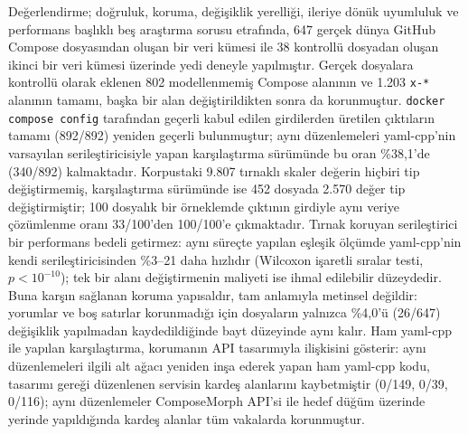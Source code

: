 \documentclass[conference]{IEEEtran}
\begin{document}
Değerlendirme; doğruluk, koruma, değişiklik yerelliği, ileriye dönük
uyumluluk ve performans başlıklı beş araştırma sorusu etrafında, 647 gerçek
dünya GitHub Compose dosyasından oluşan bir veri kümesi ile 38 kontrollü
dosyadan oluşan ikinci bir veri kümesi üzerinde yedi deneyle yapılmıştır.
Gerçek dosyalara kontrollü olarak eklenen 802 modellenmemiş Compose alanının
ve 1.203 \texttt{x-*} alanının tamamı, başka bir alan değiştirildikten sonra
da korunmuştur. \texttt{docker compose config} tarafından geçerli kabul
edilen girdilerden üretilen çıktıların tamamı (892/892) yeniden geçerli
bulunmuştur; aynı düzenlemeleri yaml-cpp'nin varsayılan serileştiricisiyle
yapan karşılaştırma sürümünde bu oran \%38,1'de (340/892) kalmaktadır. Korpustaki
9.807 tırnaklı skaler değerin hiçbiri tip değiştirmemiş, karşılaştırma sürümünde ise
452 dosyada 2.570 değer tip değiştirmiştir; 100 dosyalık bir örneklemde
çıktının girdiyle aynı veriye çözümlenme oranı 33/100'den 100/100'e
çıkmaktadır. Tırnak koruyan serileştirici
bir performans bedeli getirmez: aynı süreçte yapılan eşleşik ölçümde
yaml-cpp'nin kendi serileştiricisinden \%3--21 daha hızlıdır (Wilcoxon
işaretli sıralar testi, $p < 10^{-10}$); tek bir alanı değiştirmenin
maliyeti ise ihmal edilebilir düzeydedir. Buna karşın sağlanan koruma
yapısaldır, tam anlamıyla metinsel değildir: yorumlar ve boş satırlar
korunmadığı için dosyaların yalnızca \%4,0'ü (26/647) değişiklik yapılmadan
kaydedildiğinde bayt düzeyinde aynı kalır. Ham yaml-cpp ile yapılan
karşılaştırma, korumanın API tasarımıyla ilişkisini gösterir: aynı
düzenlemeleri ilgili alt ağacı yeniden inşa ederek yapan ham yaml-cpp kodu,
tasarımı gereği düzenlenen servisin kardeş alanlarını kaybetmiştir (0/149,
0/39, 0/116); aynı düzenlemeler ComposeMorph API'si ile hedef düğüm üzerinde yerinde
yapıldığında kardeş alanlar tüm vakalarda korunmuştur.
\end{document}
